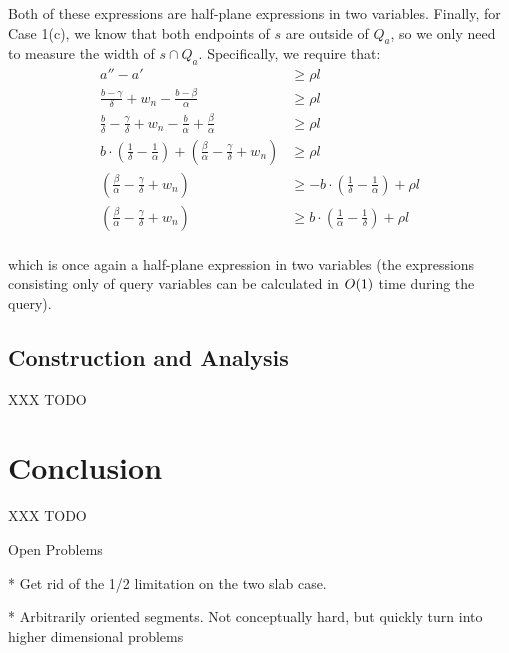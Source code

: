 \noindent Both of these expressions are half-plane expressions in two variables.  Finally, for Case 1(c), we know that both endpoints of $s$ are outside of $Q_a$, so we only need to measure the width of $s \cap Q_a$.  Specifically, we require that:
\[
\begin{split} 
a'' - a' &\geq \rho l \\
%
\frac{b - \gamma}{\delta} + w_n - \frac{b - \beta}{\alpha} &\geq \rho l \\
%
\frac{b}{\delta} - \frac{\gamma}{\delta} + w_n - \frac{b}{\alpha} + \frac{\beta}{\alpha} &\geq \rho l \\
%
b \cdot \left ( \frac{1}{\delta} - \frac{1}{\alpha} \right ) + \left ( \frac{\beta}{\alpha} - \frac{\gamma}{\delta} + w_n \right ) &\geq \rho l \\
%
\left ( \frac{\beta}{\alpha} - \frac{\gamma}{\delta} + w_n \right ) &\geq -b \cdot \left (\frac{1}{\delta} - \frac{1}{\alpha} \right ) + \rho l \\
%
\left ( \frac{\beta}{\alpha} - \frac{\gamma}{\delta} + w_n \right ) &\geq b \cdot \left (\frac{1}{\alpha} - \frac{1}{\delta} \right ) + \rho l \\
%
\end{split}
\]

\noindent
which is once again a half-plane expression in two variables (the expressions consisting only of query variables can be calculated in $O\!\left(1\right)$ time during the query).


\subsection{Construction and Analysis}
\label{:slabs:two:analysis}

XXX TODO


\section{Conclusion}
\label{:slabs:concl}

XXX TODO

Open Problems

* Get rid of the 1/2 limitation on the two slab case.

* Arbitrarily oriented segments. Not conceptually hard, but quickly turn into higher dimensional problems

